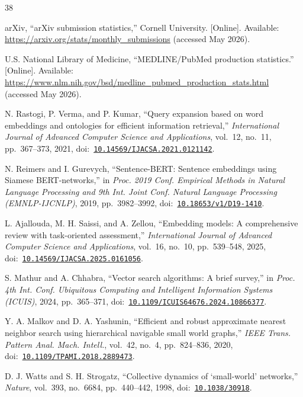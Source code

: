 \documentclass[conference, letterpaper]{IEEEtran}
\newcommand{\doi}[1]{doi:~\href{https://doi.org/#1}{\nolinkurl{#1}}}
\newcommand{\ijacsa}{\textit{International Journal of Advanced Computer Science and Applications}}
\begin{document}
\begin{thebibliography}{38}

arXiv, ``arXiv submission statistics,'' Cornell University. [Online]. Available: \url{https://arxiv.org/stats/monthly_submissions} (accessed May 2026).

U.S. National Library of Medicine, ``MEDLINE/PubMed production statistics.'' [Online]. Available: \url{https://www.nlm.nih.gov/bsd/medline_pubmed_production_stats.html} (accessed May 2026).

N. Rastogi, P. Verma, and P. Kumar, ``Query expansion based on word embeddings and ontologies for efficient information retrieval,'' \ijacsa, vol.~12, no.~11, pp.~367--373, 2021, \doi{10.14569/IJACSA.2021.0121142}.

N. Reimers and I. Gurevych, ``Sentence-BERT: Sentence embeddings using Siamese BERT-networks,'' in \textit{Proc. 2019 Conf. Empirical Methods in Natural Language Processing and 9th Int. Joint Conf. Natural Language Processing (EMNLP-IJCNLP)}, 2019, pp.~3982--3992, \doi{10.18653/v1/D19-1410}.

L. Ajallouda, M. H. Saissi, and A. Zellou, ``Embedding models: A comprehensive review with task-oriented assessment,'' \ijacsa, vol.~16, no.~10, pp.~539--548, 2025, \doi{10.14569/IJACSA.2025.0161056}.

S. Mathur and A. Chhabra, ``Vector search algorithms: A brief survey,'' in \textit{Proc. 4th Int. Conf. Ubiquitous Computing and Intelligent Information Systems (ICUIS)}, 2024, pp.~365--371, \doi{10.1109/ICUIS64676.2024.10866377}.

Y. A. Malkov and D. A. Yashunin, ``Efficient and robust approximate nearest neighbor search using hierarchical navigable small world graphs,'' \textit{IEEE Trans. Pattern Anal. Mach. Intell.}, vol.~42, no.~4, pp.~824--836, 2020, \doi{10.1109/TPAMI.2018.2889473}.

D. J. Watts and S. H. Strogatz, ``Collective dynamics of `small-world' networks,'' \textit{Nature}, vol.~393, no.~6684, pp.~440--442, 1998, \doi{10.1038/30918}.


\end{thebibliography}
\end{document}
